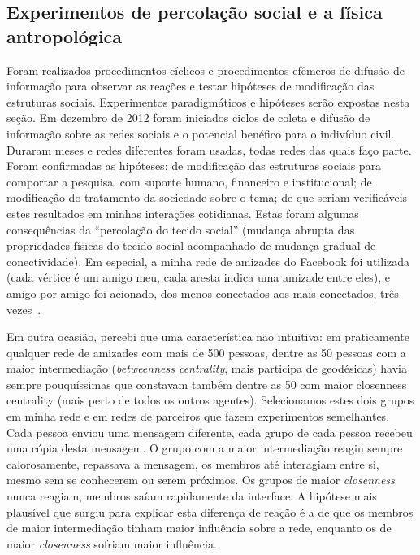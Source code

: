 \documentclass[a4paper,openright,12pt]{report} %
\begin{document}
\subsection{Experimentos de percolação social e a física antropológica}\label{sec:exp}
Foram realizados procedimentos cíclicos e procedimentos efêmeros
de difusão de informação para observar as reações
e testar hipóteses de modificação das estruturas sociais.
Experimentos paradigmáticos e hipóteses serão expostas nesta seção.
    Em dezembro de 2012 foram iniciados ciclos de
        coleta e difusão de informação sobre
        as redes sociais e o potencial benéfico para
        o indivíduo civil. Duraram meses e redes diferentes
        foram usadas, todas redes das quais faço parte. 
	Foram confirmadas 
        as hipóteses: 
	de modificação das
        estruturas sociais para comportar a pesquisa,
        com suporte humano, financeiro e institucional;
	de modificação
        do tratamento da sociedade sobre o tema;
        de que seriam
        verificáveis estes resultados em minhas
        interações cotidianas.
        Estas foram algumas consequências da ``percolação
        do tecido social'' (mudança abrupta das propriedades físicas do tecido social
        acompanhado de mudança gradual de conectividade).
        Em especial, a minha rede de amizades do Facebook
        foi utilizada (cada vértice é um amigo meu,
        cada aresta indica uma amizade entre eles), e
        amigo por amigo foi acionado,
	dos menos conectados aos mais conectados, três vezes~\cite{mit}.

    Em outra ocasião, percebi que
        uma característica não intuitiva:
        em praticamente qualquer rede de amizades com mais de 500 pessoas, dentre as 50 pessoas com a
        maior intermediação (\emph{betweenness centrality}, mais participa de geodésicas)
        havia sempre pouquíssimas que constavam também dentre as 50
        com maior closenness centrality (mais perto de todos os outros agentes). 
        Selecionamos estes dois grupos em minha
        rede e em redes de parceiros que fazem experimentos semelhantes.
        Cada pessoa enviou uma mensagem diferente, cada grupo de cada pessoa
        recebeu uma cópia desta mensagem. O grupo com a maior intermediação
        reagiu sempre calorosamente, repassava a mensagem, os membros até interagiam entre si,
        mesmo sem se conhecerem ou serem próximos.
        Os grupos de maior \emph{closenness} nunca reagiam, membros saíam rapidamente 
        da interface. A hipótese mais plausível que surgiu
        para explicar esta diferença de reação é a de que os membros de maior intermediação
        tinham maior influência sobre
        a rede, enquanto os de maior \emph{closenness} sofriam maior influência.
\end{document}
